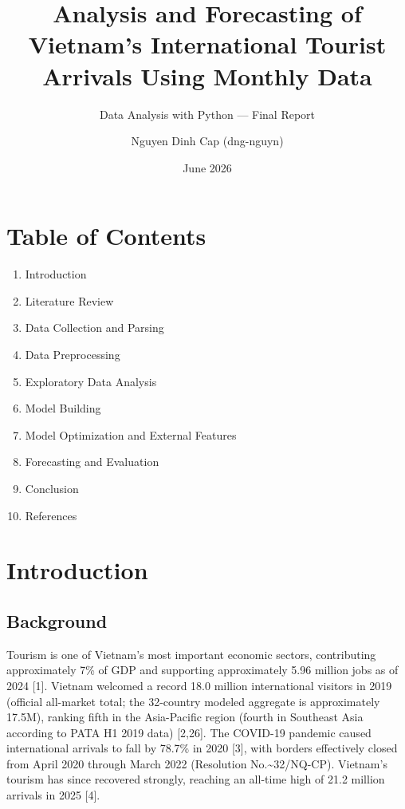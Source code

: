 \documentclass[
]{article}
\title{Analysis and Forecasting of Vietnam's International Tourist
Arrivals Using Monthly Data}
\subtitle{Data Analysis with Python --- Final Report}
\author{Nguyen Dinh Cap (dng-nguyn)}
\date{June 2026}
\providecommand{\tightlist}{%
  \setlength{\itemsep}{0pt}\setlength{\parskip}{0pt}}
\begin{document}
\maketitle

\newpage

\section{Table of Contents}\label{table-of-contents}

\begin{enumerate}
\def\labelenumi{\arabic{enumi}.}
\tightlist
\item
  Introduction
\item
  Literature Review
\item
  Data Collection and Parsing
\item
  Data Preprocessing
\item
  Exploratory Data Analysis
\item
  Model Building
\item
  Model Optimization and External Features
\item
  Forecasting and Evaluation
\item
  Conclusion
\item
  References
\end{enumerate}

\newpage

\section{Introduction}\label{introduction}

\subsection{Background}\label{background}

Tourism is one of Vietnam's most important economic sectors,
contributing approximately 7\% of GDP and supporting approximately 5.96
million jobs as of 2024 {[}1{]}. Vietnam welcomed a record 18.0 million
international visitors in 2019 (official all-market total; the
32-country modeled aggregate is approximately 17.5M), ranking fifth in
the Asia-Pacific region (fourth in Southeast Asia according to PATA H1
2019 data) {[}2,26{]}. The COVID-19 pandemic caused international
arrivals to fall by 78.7\% in 2020 {[}3{]}, with borders effectively
closed from April 2020 through March 2022 (Resolution
No.\textasciitilde32/NQ-CP). Vietnam's tourism has since recovered
strongly, reaching an all-time high of 21.2 million arrivals in 2025
{[}4{]}.
\end{document}
